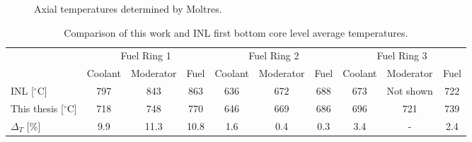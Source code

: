 \begin{figure}[htbp!]
  \centering
  \hfill
  \caption{Axial temperatures determined by Moltres.}
  \label{fig:ex2a-temps}
\end{figure}

\begin{table}[htbp!]
\centering
      \caption{Comparison of this work and INL \cite{strydom_inl_2013} first bottom core level average temperatures.}
      \label{tab:th-ex2a-results}
  \begin{tabular}{l|ccc|ccc|ccc}
    \toprule
          & \multicolumn{3}{c|}{Fuel Ring 1} & \multicolumn{3}{c|}{Fuel Ring 2} & \multicolumn{3}{c}{Fuel Ring 3} \\ \cline{2-10} 
          & Coolant & Moderator & Fuel & Coolant & Moderator & Fuel & Coolant & Moderator & Fuel \\
    \midrule
INL [$^{\circ}$C]         & 797  & 843  & 863  & 636  & 672  & 688  & 673  & Not shown  & 722  \\
This thesis [$^{\circ}$C] & 718  & 748  & 770  & 646  & 669  & 686  & 696  & 721        & 739  \\
$\Delta_T$ [\%]           & 9.9  & 11.3 & 10.8 & 1.6  & 0.4  & 0.3  & 3.4  & -          & 2.4  \\
    \bottomrule
  \end{tabular}
\end{table}

